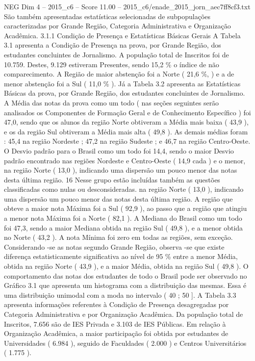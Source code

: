 \begin{textsample}{NEG Dim 4 – 2015\_c6 – Score 11.00 – 2015\_c6/enade\_2015\_jorn\_aec7ff8cf3.txt}
São também apresentadas estatísticas selecionadas de subpopulações caracterizadas por Grande Região, Categoria Administrativa e Organização Acadêmica. 3.1.1 Condição de Presença e Estatísticas Básicas Gerais A Tabela 3.1 apresenta a Condição de Presença na prova, por Grande Região, dos estudantes concluintes de Jornalismo.
A população total de Inscritos foi de 10.759.
Destes, 9.129 estiveram Presentes, sendo 15,2 \% o índice de não comparecimento.
A Região de maior abstenção foi a Norte ( 21,6 \%, ) e a de menor abstenção foi a Sul ( 11,0 \% ).
Já a Tabela 3.2 apresenta as Estatísticas Básicas da prova, por Grande Região, dos estudantes concluintes de Jornalismo.
A Média das notas da prova como um todo ( nas seções seguintes serão analisados os Componentes de Formação Geral e de Conhecimento Específico ) foi 47,0, sendo que os alunos da região Norte obtiveram a Média mais baixa ( 43,9 ), e os da região Sul obtiveram a Média mais alta ( 49,8 ).
As demais médias foram : 45,4 na região Nordeste ; 47,2 na região Sudeste ; e 46,7 na região Centro-Oeste.
O Desvio padrão para o Brasil como um todo foi 14,4, sendo o maior Desvio padrão encontrado nas regiões Nordeste e Centro-Oeste ( 14,9 cada ) e o menor, na região Norte ( 13,0 ), indicando uma dispersão um pouco menor das notas desta última região. 16 Nesse grupo estão incluídas também as questões classificadas como nulas ou desconsideradas. na região Norte ( 13,0 ), indicando uma dispersão um pouco menor das notas desta última região.
A região que obteve a maior nota Máxima foi a Sul ( 92,9 ), ao passo que a região que atingiu a menor nota Máxima foi a Norte ( 82,1 ).
A Mediana do Brasil como um todo foi 47,3, sendo a maior Mediana obtida na região Sul ( 49,8 ), e a menor obtida no Norte ( 43,2 ).
A nota Mínima foi zero em todas as regiões, sem exceção.
Considerando -se as notas segundo Grande Região, observa -se que existe diferença estatisticamente significativa ao nível de 95 \% entre a menor Média, obtida na região Norte ( 43,9 ), e a maior Média, obtida na região Sul ( 49,8 ).
O comportamento das notas dos estudantes de todo o Brasil pode ser observado no Gráfico 3.1 que apresenta um histograma com a distribuição das mesmas.
Essa é uma distribuição unimodal com a moda no intervalo ( 40 ; 50 ].
A Tabela 3.3 apresenta informações referentes à Condição de Presença desagregadas por Categoria Administrativa e por Organização Acadêmica.
Da população total de Inscritos, 7.656 são de IES Privada e 3.103 de IES Públicas.
Em relação à Organização Acadêmica, a maior participação foi obtida por estudantes de Universidades ( 6.984 ), seguido de Faculdades ( 2.000 ) e Centros Universitários ( 1.775 ).

\end{textsample}
